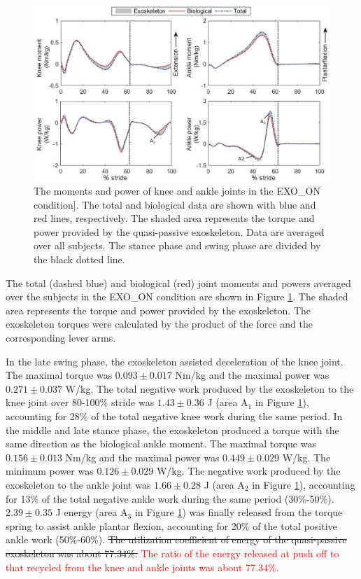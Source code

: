\documentclass[twocolumn,cleanfoot,10pt]{asme2ej}
\begin{document}
\begin{figure}[t]
	\centering
	\includegraphics[width=17cm]{exo.eps}
	\caption{The moments and power of knee and ankle joints in the EXO\_ON condition]. The total and biological data are shown with blue and red lines, respectively. The shaded area represents the torque and power provided by the quasi-passive exoskeleton. Data are averaged over all subjects. The stance phase and swing phase are divided by the black dotted line.}
	\label{fig:exo}
\end{figure}

The total (dashed blue) and biological (red) joint moments and powers averaged over the subjects in the EXO\_ON condition are shown in Figure \ref{fig:exo}. The shaded area represents the torque and power provided by the exoskeleton. The exoskeleton torques were calculated by the product of the force and the corresponding lever arms. 

In the late swing phase, the exoskeleton assisted deceleration of the knee joint. The maximal torque was $0.093\pm0.017$ Nm/kg and the maximal power was $0.271\pm0.037$ W/kg. The total negative work produced by the exoskeleton to the knee joint over 80-100\% stride was $1.43\pm0.36$ J (area A$_{1}$ in Figure \ref{fig:exo}), accounting for 28\% of the total negative knee work during the same period. In the middle and late stance phase, the exoskeleton produced a torque with the same direction as the biological ankle moment. The maximal torque was $0.156\pm0.013$ Nm/kg and the maximal power was $0.449\pm0.029$ W/kg. The minimum power was $0.126\pm0.029$ W/kg. The negative work produced by the exoskeleton to the ankle joint was $1.66\pm0.28$ J (area A$_{2}$ in Figure \ref{fig:exo}), accounting for 13\% of the total negative ankle work during the same period (30\%-50\%). $2.39\pm0.35$ J energy (area A$_{3}$ in Figure \ref{fig:exo}) was finally released from the torque spring to assist ankle plantar flexion, accounting for 20\% of the total positive ankle work (50\%-60\%). \sout{The utilization coefficient of energy of the quasi-passive exoskeleton was about 77.34\%.} \textcolor{red}{The ratio of the energy released at push off to that recycled from the knee and ankle joints was about 77.34\%.}
\end{document}
